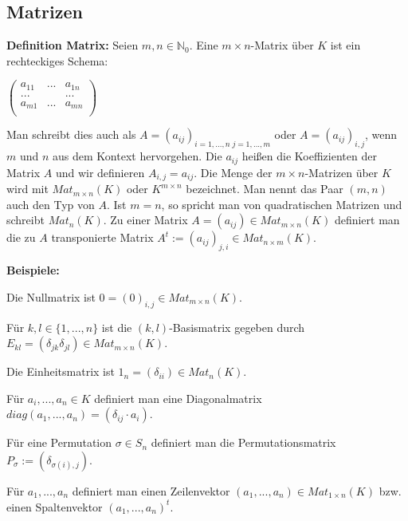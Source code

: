 \documentclass[11pt]{article}
\begin{document}
	\subsection{Matrizen}
		\begin{mdframed}[backgroundcolor=blue!20]
			\textbf{Definition Matrix:} Seien $m,n \in \mathbb N_0$. Eine $m\times n$-Matrix über $K$ ist ein rechteckiges 
			Schema:
			\begin{center}
			$\begin{pmatrix}
				a_{11} & ... & a_{1n}\\
				... &  & ...\\
				a_{m1} & ... & a_{mn}\\
			\end{pmatrix}$
			\end{center}
			Man schreibt dies auch als $A=(a_{ij})_{i=1,...,n \; j=1,...,m}$ oder $A=(a_{ij})_{i,j}$, wenn $m$ und $n$ 
			aus dem Kontext hervorgehen. Die $a_{ij}$ heißen die Koeffizienten der Matrix $A$ und wir definieren $A_{i,j}=
			a_{ij}$. Die Menge der $m\times n$-Matrizen über $K$ wird mit $Mat_{m\times n}(K)$ oder $K^{m\times n}$ 
			bezeichnet. Man nennt das Paar $(m,n)$ auch den Typ von $A$. Ist $m=n$, so spricht man von quadratischen 
			Matrizen und schreibt $Mat_n(K)$. Zu einer Matrix $A=(a_{ij}) \in Mat_{m\times n}(K)$ definiert man die zu $A$ 
			transponierte Matrix $A^t := (a_{ij})_{j,i} \in Mat_{n\times m}(K)$.
		\end{mdframed}
		
		\textbf{Beispiele:}
		\begin{compactitem}
			\item Die Nullmatrix ist $0=(0)_{i,j} \in Mat_{m\times n}(K)$.
			\item Für $k,l \in \{1,...,n\}$ ist die $(k,l)$-Basismatrix gegeben durch $E_{kl}=(\delta_{jk}\delta_{jl})\in 
			Mat_{m\times n}(K)$.
			\item Die Einheitsmatrix ist $1_n=(\delta_{ii})\in Mat_n(K)$.
			\item Für $a_i,...,a_n \in K$ definiert man eine Diagonalmatrix $diag(a_1,...,a_n)=(\delta_{ij}\cdot a_i)$.
			\item Für eine Permutation $\sigma\in S_n$ definiert man die Permutationsmatrix $P_\sigma := (\delta_{\sigma
			(i),j})$.
			\item Für $a_1,...,a_n$ definiert man einen Zeilenvektor $(a_1,...,a_n)\in Mat_{1\times n}(K)$ bzw. einen 
			Spaltenvektor $(a_1,...,a_n)^t$.
		\end{compactitem}
		
\end{document}
